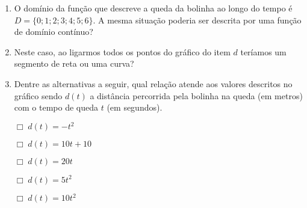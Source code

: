 \documentclass[10 pt,usenames,dvipsnames, oneside]{article}
\begin{document}
\begin{enumerate}
\item {} 
O domínio da função que descreve a queda da bolinha ao longo do tempo é \(D = \{0 ; 1 ; 2 ; 3 ; 4 ; 5 ; 6 \}\). A mesma situação poderia ser descrita por uma função de domínio contínuo?

\item {} 
Neste caso, ao ligarmos todos os pontos do gráfico do item \(d\) teríamos um segmento de reta ou uma curva?

\item {} 
Dentre as alternativas a seguir, qual relação atende aos valores descritos no gráfico sendo \(d(t)\) a distância percorrida pela bolinha na queda (em metros) com o tempo de queda \(t\) (em segundos).

\(\Box \; d(t)= -t^2\)

\(\Box \; d(t)= 10t+10\)

\(\Box \; d(t)= 20t\)

\(\Box \; d(t)= 5t^2\)

\(\Box \; d(t)= 10t^2\)

\end{enumerate}
\end{document}
